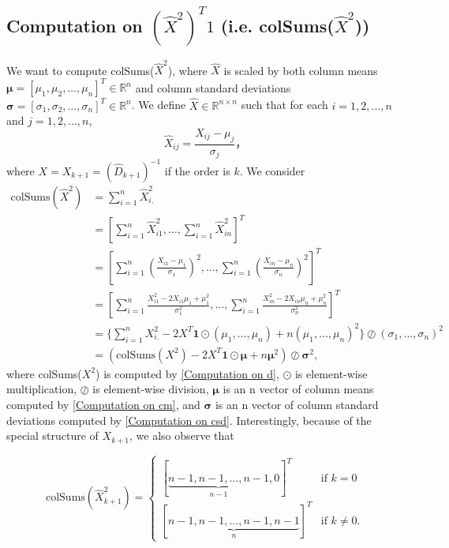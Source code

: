 \subsection{Computation on $(\hat{X}^2)^T 1$ (i.e. colSums($\hat{X}^2$))} \label{Computation on std_d}
We want to compute colSums($\hat{X}^2$), where $\hat{X}$ is scaled by both column means $\bm{\mu} = [\mu_1, \mu_2, \dots, \mu_n]^T \in \mathbb{R}^n$ and column standard deviations $\bm{\sigma} = [\sigma_1, \sigma_2, \dots, \sigma_n]^T \in \mathbb{R}^n$. We define $\hat{X} \in \mathbb{R}^{n\times n}$ such that for each $i=1,2,\dots,n$ and $j=1,2,\dots,n$, 
\begin{equation}
    \hat{X}_{ij} = \frac{X_{ij}-\mu_j}{\sigma_j}，
\end{equation}
where $X = X_{k+1} = (\hat{D}_{k+1})^{-1}$ if the order is $k$.  
We consider
\begin{align}
    \text{colSums}(\hat{X}^2) & = \sum_{i=1}^{n} \hat{X}_{i.}^2 \\
    & = [\sum_{i=1}^{n}\hat{X}_{i1}^2, \dots, \sum_{i=1}^{n}\hat{X}_{in}^2]^T \\
    & = [\sum_{i=1}^{n}(\frac{X_{i1}-\mu_1}{\sigma_1})^2, \dots, \sum_{i=1}^{n}(\frac{X_{in}-\mu_n}{\sigma_n})^2]^T  \\
    & = [\sum_{i=1}^{n}\frac{X_{i1}^2 - 2X_{i1}\mu_1 + \mu_1^2}{\sigma_1^2}, \dots, \sum_{i=1}^{n}\frac{X_{in}^2 - 2X_{in}\mu_n + \mu_n^2}{\sigma_n^2}]^T \\
    & = \big\{ \sum_{i=1}^{n} X_{i.}^2 - 2X^T \bm{1} \odot{(\mu_1, \dots, \mu_n)} + n(\mu_1, \dots, \mu_n)^2\big\} \oslash{(\sigma_1, \dots, \sigma_n)^2} \\
    & = (\text{colSums}(X^2) - 2X^T\bm{1}\odot{\bm{\mu}} + n\bm{\mu}^2)\oslash{\bm{\sigma}^2},
\end{align}
where colSums($X^2$) is computed by \ref{Computation on d}, $\odot$ is element-wise multiplication, $\oslash$ is element-wise division, $\bm{\mu}$ is an n vector of column means computed by \ref{Computation on cm}, and 
$\bm{\sigma}$ is an n vector of column standard deviations computed by \ref{Computation on csd}.
Interestingly, because of the special structure of $X_{k+1}$, we also observe that 

\begin{equation}
\text{colSums}(\hat{X}_{k+1}^2) = 
\begin{cases} 
      [\underbrace{n-1, n-1, \dots, n-1}_{n-1}, 0]^T & \text{if } k = 0 \\
      [\underbrace{n-1, n-1, \dots, n-1, n-1}_{n}]^T & \text{if } k \neq 0. 
\end{cases}
\end{equation}



